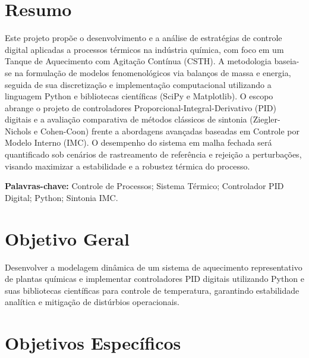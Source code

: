 \documentclass[12pt, a4paper]{article}
\begin{document}
\section*{Resumo}

Este projeto propõe o desenvolvimento e a análise de estratégias de controle digital aplicadas a processos térmicos na indústria química, com foco em um Tanque de Aquecimento com Agitação Contínua (CSTH). A metodologia baseia-se na formulação de modelos fenomenológicos via balanços de massa e energia, seguida de sua discretização e implementação computacional utilizando a linguagem Python e bibliotecas científicas (SciPy e Matplotlib). O escopo abrange o projeto de controladores Proporcional-Integral-Derivativo (PID) digitais e a avaliação comparativa de métodos clássicos de sintonia (Ziegler-Nichols e Cohen-Coon) frente a abordagens avançadas baseadas em Controle por Modelo Interno (IMC). O desempenho do sistema em malha fechada será quantificado sob cenários de rastreamento de referência e rejeição a perturbações, visando maximizar a estabilidade e a robustez térmica do processo.

\textbf{Palavras-chave:} Controle de Processos; Sistema Térmico; Controlador PID Digital; Python; Sintonia IMC.

\newpage
\section{Objetivo Geral}

Desenvolver a modelagem dinâmica de um sistema de aquecimento representativo de plantas químicas e implementar controladores PID digitais utilizando Python e suas bibliotecas científicas para controle de temperatura, garantindo estabilidade analítica e mitigação de distúrbios operacionais.


\section{Objetivos Específicos}
\end{document}
